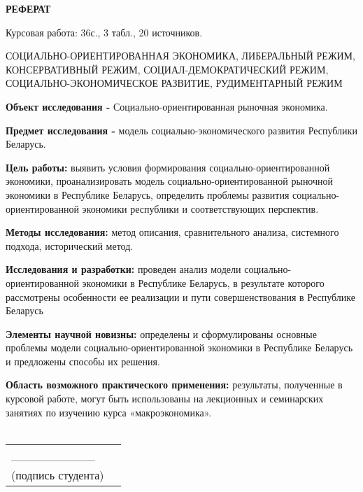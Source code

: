 \documentclass[14pt,a4paper]{article}
\begin{document}
    \newpage
    \begin{center}
        \textbf{\Large{РЕФЕРАТ}}
    \end{center}
    \par
    Курсовая работа: 36с., 3 табл., 20 источников.
    \\
    \par
    \large{СОЦИАЛЬНО-ОРИЕНТИРОВАННАЯ ЭКОНОМИКА, ЛИБЕРАЛЬНЫЙ РЕЖИМ, КОНСЕРВАТИВНЫЙ РЕЖИМ, СОЦИАЛ-ДЕМОКРАТИЧЕСКИЙ РЕЖИМ,}
    \\
    \large{СОЦИАЛЬНО-ЭКОНОМИЧЕСКОЕ РАЗВИТИЕ, РУДИМЕНТАРНЫЙ РЕЖИМ}
    \\
    \par
    \textbf{Объект исследования - } Социально-ориентированная рыночная экономика.
    \par
    \textbf{Предмет исследования - } модель социально-экономического развития Республики Беларусь.
    \par
    \textbf{Цель работы:} выявить условия формирования социально-ориентированной экономики, проанализировать модель социально-ориентированной рыночной экономики в Республике Беларусь, определить проблемы развития социально-ориентированной экономики республики и соответствующих перспектив.
    \par
    \textbf{Методы исследования:} метод описания, сравнительного анализа, системного подхода, исторический метод.
    \par
    \textbf{Исследования и разработки:} проведен анализ модели социально-ориентированной экономики в Республике Беларусь, в результате которого рассмотрены особенности ее реализации и пути совершенствования в Республике Беларусь
    \par
    \textbf{Элементы научной новизны:} определены и сформулированы основные проблемы модели социально-ориентированной экономики в Республике Беларусь и предложены способы их решения.
    \par
    \textbf{Область возможного практического применения:} результаты, полученные в курсовой работе, могут быть использованы на лекционных и семинарских занятиях по изучению курса «макроэкономика».
    \\
    \\
    \hfill\begin{tabular}{lp{.5\linewidth}@{}}
              \_\_\_\_\_\_\_\_\_\_
              \\
              (подпись студента) \\
    \end{tabular}
\end{document}
